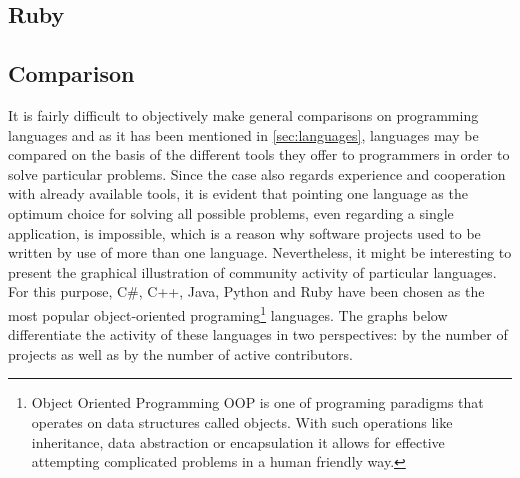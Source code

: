 \subsection{Ruby}\label{subsec:ruby}

\subsection{Comparison}\label{subsec:lang_compare}
It is fairly difficult to objectively make general comparisons on programming languages and as it has been mentioned in \ref{sec:languages}, languages may be compared on the basis of the different tools they offer to programmers in order to solve particular problems. Since the case also regards experience and cooperation with already available tools, it is evident that pointing one language as the optimum choice for solving all possible problems, even regarding a single application, is impossible, which is a reason why software projects used to be written by use of more than one language. Nevertheless, it might be interesting to present the graphical illustration of community activity of particular languages. For this purpose, C\#, C++, Java, Python and Ruby have been chosen as the most popular object-oriented programing\footnote{Object Oriented Programming OOP is one of programing paradigms that operates on data structures called objects. With such operations like inheritance, data abstraction or encapsulation it allows for effective attempting complicated problems in a human friendly way.} languages. The graphs below differentiate the activity of these languages in two perspectives: by the number of projects as well as by the number of active contributors.
